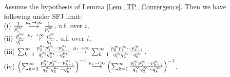 \begin{lemma}
	\label{Lemma_Intermediate_result_2}
	Assume the hypothesis of Lemma \ref{Lem_TP_Convergence}. Then we have following under SFJ limit:\\
	(i) $\frac{1}{p_i^{\mu_\epsilon}} \stackrel{{\mu_\epsilon} \to \infty}{\longrightarrow} \frac{1}{p_i^\infty}$,   u.f.  over $i$,\\
	(ii)  $\frac{p_i^{\mu_\epsilon}}{q_i^{\mu_\epsilon}} \stackrel{{\mu_\epsilon} \to \infty}{\longrightarrow} \frac{p_i^\infty}{q_i^\infty}$,   u.f.  over $i$, \\
	(iii) $\sum_{k = 1}^{\infty} \frac{p_0^{\mu_\epsilon} p_1^{\mu_\epsilon} \cdots p_{k-1}^{\mu_\epsilon}}{q_1^{\mu_\epsilon} q_2^{\mu_\epsilon} \cdots q_k^{\mu_\epsilon}}
	\stackrel{{\mu_\epsilon} \to \infty}{\longrightarrow}
	\sum_{k = 1}^{\infty} \frac{p_0^{\infty} p_1^{\infty } \cdots p_{k-1}^{\infty }}{q_1^{\infty } q_2^{ \infty  } \cdots q_k^{\infty  }}$.
	\\
	(iv) $\left ( \sum_{k = 1}^{\infty} \frac{p_0^{\mu_\epsilon} p_1^{\mu_\epsilon} \cdots p_{k-1}^{\mu_\epsilon}}{q_1^{\mu_\epsilon} q_2^{\mu_\epsilon} \cdots q_k^{\mu_\epsilon}} \right )^{-1}
	\stackrel{{\mu_\epsilon} \to \infty}{\longrightarrow}
	\left (	\sum_{k = 1}^{\infty} \frac{p_0^{\infty} p_1^{\infty } \cdots p_{k-1}^{\infty }}{q_1^{\infty } q_2^{ \infty  } \cdots q_k^{\infty  }} \right )^{-1}$.
\end{lemma}
